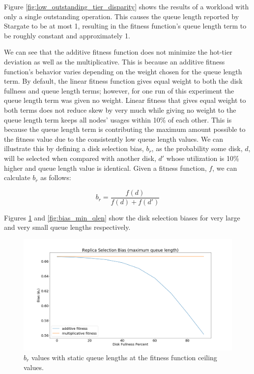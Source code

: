 \documentclass[12pt]{article}
\begin{document}
    Figure \ref{fig:low_outstanding_tier_disparity} shows the results of a
    workload with only a single outstanding operation. This causes the queue
    length reported by Stargate to be at most 1, resulting in the fitness
    function's queue length term to be roughly constant and approximately 1.
    
    We can see that the additive fitness function does not minimize the
    hot-tier deviation as well as the multiplicative. This is because an
    additive fitness function's behavior varies depending on the weight chosen
    for the queue length term. By default, the linear fitness function
    gives equal weight to both the disk fullness and queue length terms;
    however, for one run of this experiment the queue length term was given no
    weight. Linear fitness that gives equal weight to both terms does not
    reduce skew by very much while giving no weight to the queue length term
    keeps all nodes' usages within 10\% of each other. This is because the
    queue length term is contributing the maximum amount possible to the
    fitness value due to the consistently low queue length values. We can
    illustrate this by defining a disk selection bias, $b_r$, as the
    probability some disk, $d$, will be selected when compared with another
    disk, $d'$ whose utilization is 10\% higher and queue length value is
    identical. Given a fitness function, $f$, we can calculate $b_r$ as
    follows:

    \begin{equation}
      b_r = \frac{f(d)}{f(d) + f(d')}
    \end{equation}

    Figures \ref{fig:bias_max_qlen} and \ref{fig:bias_min_qlen} show the disk
    selection biases for very large and very small queue lengths respectively.

    \begin{figure}[h]
      \centering
      \includegraphics[scale=0.30]{images/replica_selection_bias_max_qlen.png} 
      \caption{$b_r$ values with static queue lengths at the fitness
               function ceiling values.}
      \label{fig:bias_max_qlen}
    \end{figure}
\end{document}
